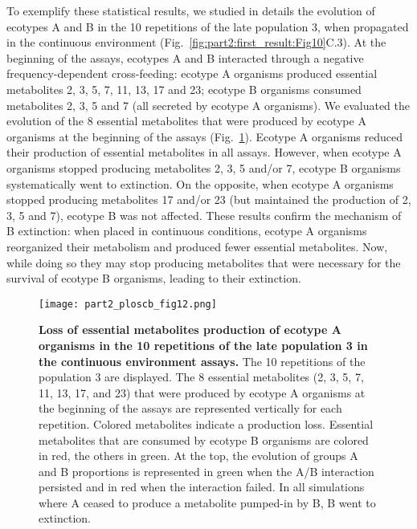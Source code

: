 To exemplify these statistical results, we studied in details the evolution of ecotypes A and B in the 10 repetitions of the late population 3, when propagated in the continuous environment (Fig.~\ref{fig:part2:first_result:Fig10}C.3). At the beginning of the assays, ecotypes A and B interacted through a negative frequency-dependent cross-feeding: ecotype A organisms produced essential metabolites 2, 3, 5, 7, 11, 13, 17 and 23; ecotype B organisms consumed metabolites 2, 3, 5 and 7 (all secreted by ecotype A organisms). We evaluated the evolution of the 8 essential metabolites that were produced by ecotype A organisms at the beginning of the assays (Fig.~\ref{fig:part2:first_result:Fig12}). Ecotype A organisms reduced their production of essential metabolites in all assays. However, when ecotype A organisms stopped producing metabolites 2, 3, 5 and/or 7, ecotype B organisms systematically went to extinction. On the opposite, when ecotype A organisms stopped producing metabolites 17 and/or 23 (but maintained the production of 2, 3, 5 and 7), ecotype B was not affected. These results confirm the mechanism of B extinction: when placed in continuous conditions, ecotype A organisms reorganized their metabolism and produced fewer essential metabolites. Now, while doing so they may stop producing metabolites that were necessary for the survival of ecotype B organisms, leading to their extinction.

\begin{figure}[!h]
\centering
\texttt{[image: part2\_ploscb\_fig12.png]}
\caption[Loss of essential metabolites production of ecotype A organisms in the 10 repetitions of the late population 3 in the continuous environment assays.]{{\bf Loss of essential metabolites production of ecotype A organisms in the 10 repetitions of the late population 3 in the continuous environment assays.} The 10 repetitions of the population 3 are displayed. The 8 essential metabolites (2, 3, 5, 7, 11, 13, 17, and 23) that were produced by ecotype A organisms at the beginning of the assays are represented vertically for each repetition. Colored metabolites indicate a production loss. Essential metabolites that are consumed by ecotype B organisms are colored in red, the others in green. At the top, the evolution of groups A and B proportions is represented in green when the A/B interaction persisted and in red when the interaction failed. In all simulations where A ceased to produce a metabolite pumped-in by B, B went to extinction.}
\label{fig:part2:first_result:Fig12}
\end{figure}

